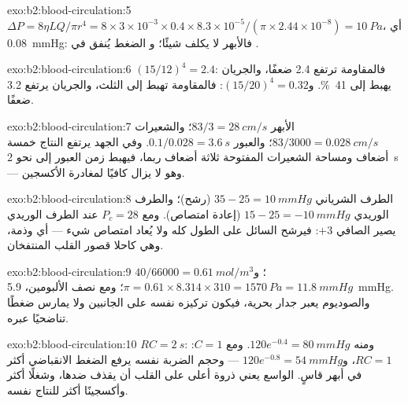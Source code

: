 \begin{solution}{exo:b2:blood-circulation:5}
$\Delta P = 8\eta LQ/\pi r^{4} = 8\times 3\times 10^{-3}\times
0.4\times 8.3\times 10^{-5}/(\pi\times 2.44\times 10^{-8}) =
\qty{10}{Pa}$، أي \qty{0.08}{mmHg}: فالأبهر لا يكلف شيئًا؛ و
الضغط يُنفق في .
\end{solution}

\begin{solution}{exo:b2:blood-circulation:6}
$(15/12)^{4} = 2.4$: فالمقاومة ترتفع 2.4 ضعفًا، والجريان يهبط إلى
\qty{41}{\%}. و$(15/20)^{4} = 0.32$: فالمقاومة تهبط إلى الثلث، والجريان
يرتفع 3.2 ضعفًا.
\end{solution}

\begin{solution}{exo:b2:blood-circulation:7}
الأبهر $83/3 = \qty{28}{cm/s}$؛ والشعيرات $83/3000 =
\qty{0.028}{cm/s}$؛ والعبور $0.1/0.028 = \qty{3.6}{s}$. وفي الجهد
يرتفع النتاج خمسة أضعاف ومساحة الشعيرات المفتوحة ثلاثة
أضعاف ربما، فيهبط زمن العبور إلى نحو \qty{2}{s} --- وهو لا يزال
كافيًا لمغادرة الأكسجين.
\end{solution}

\begin{solution}{exo:b2:blood-circulation:8}
الطرف الشرياني $35 - 25 = \qty{+10}{mmHg}$ (رشح)؛ والطرف الوريدي $15
- 25 = \qty{-10}{mmHg}$ (إعادة امتصاص). ومع $P_c = 28$ عند الطرف
الوريدي يصير الصافي $+3$: فيرشح السائل على الطول كله ولا يُعاد
امتصاص شيء --- أي وذمة، وهي كاحلا قصور القلب المنتفخان.
\end{solution}

\begin{solution}{exo:b2:blood-circulation:9}
$40/66000 = \qty{0.61}{mol/m^3}$؛ و$\pi = 0.61\times 8.314\times 310 =
\qty{1570}{Pa} = \qty{11.8}{mmHg}$؛ ومع نصف الألبومين، \qty{5.9}{mmHg}.
والصوديوم يعبر جدار  بحرية، فيكون تركيزه
نفسه على الجانبين ولا يمارس ضغطًا تناضحيًا عبره.
\end{solution}

\begin{solution}{exo:b2:blood-circulation:10}
$RC = \qty{2}{s}$: ومنه $120e^{-0.4} = \qty{80}{mmHg}$. ومع $C = 1$: $RC = 1$،
و$120e^{-0.8} = \qty{54}{mmHg}$ --- وحجم الضربة نفسه يرفع
الضغط الانقباضي أكثر في أبهر قاسٍ.  الواسع
يعني ذروة أعلى على القلب أن يقذف ضدها، وشغلًا أكثر
وأكسجينًا أكثر للنتاج نفسه.
\end{solution}

